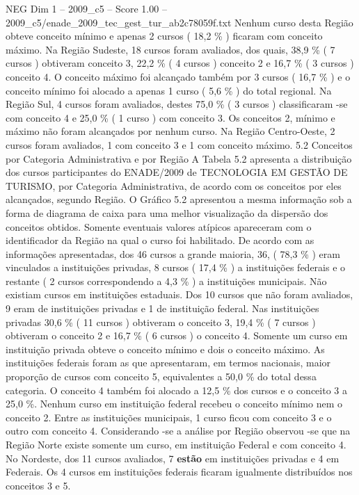 \begin{textsample}{NEG Dim 1 – 2009\_c5 – Score 1.00 – 2009\_c5/enade\_2009\_tec\_gest\_tur\_ab2c78059f.txt}
Nenhum curso desta Região obteve conceito mínimo e apenas 2 cursos ( 18,2 \% ) ficaram com conceito máximo.
Na Região Sudeste, 18 cursos foram avaliados, dos quais, 38,9 \% ( 7 cursos ) obtiveram conceito 3, 22,2 \% ( 4 cursos ) conceito 2 e 16,7 \% ( 3 cursos ) conceito 4.
O conceito máximo foi alcançado também por 3 cursos ( 16,7 \% ) e o conceito mínimo foi alocado a apenas 1 curso ( 5,6 \% ) do total regional.
Na Região Sul, 4 cursos foram avaliados, destes 75,0 \% ( 3 cursos ) classificaram -se com conceito 4 e 25,0 \% ( 1 curso ) com conceito 3.
Os conceitos 2, mínimo e máximo não foram alcançados por nenhum curso.
Na Região Centro-Oeste, 2 cursos foram avaliados, 1 com conceito 3 e 1 com conceito máximo. 5.2 Conceitos por Categoria Administrativa e por Região A Tabela 5.2 apresenta a distribuição dos cursos participantes do ENADE/2009 de TECNOLOGIA EM GESTÃO DE TURISMO, por Categoria Administrativa, de acordo com os conceitos por eles alcançados, segundo Região.
O Gráfico 5.2 apresentou a mesma informação sob a forma de diagrama de caixa para uma melhor visualização da dispersão dos conceitos obtidos.
Somente eventuais valores atípicos apareceram com o identificador da Região na qual o curso foi habilitado.
De acordo com as informações apresentadas, dos 46 cursos a grande maioria, 36, ( 78,3 \% ) eram vinculados a instituições privadas, 8 cursos ( 17,4 \% ) a instituições federais e o restante ( 2 cursos correspondendo a 4,3 \% ) a instituições municipais.
Não existiam cursos em instituições estaduais.
Dos 10 cursos que não foram avaliados, 9 eram de instituições privadas e 1 de instituição federal.
Nas instituições privadas 30,6 \% ( 11 cursos ) obtiveram o conceito 3, 19,4 \% ( 7 cursos ) obtiveram o conceito 2 e 16,7 \% ( 6 cursos ) o conceito 4.
Somente um curso em instituição privada obteve o conceito mínimo e dois o conceito máximo.
As instituições federais foram as que apresentaram, em termos nacionais, maior proporção de cursos com conceito 5, equivalentes a 50,0 \% do total dessa categoria.
O conceito 4 também foi alocado a 12,5 \% dos cursos e o conceito 3 a 25,0 \%.
Nenhum curso em instituição federal recebeu o conceito mínimo nem o conceito 2.
Entre as instituições municipais, 1 curso ficou com conceito 3 e o outro com conceito 4.
Considerando -se a análise por Região observou -se que na Região Norte existe somente um curso, em instituição Federal e com conceito 4.
No Nordeste, dos 11 cursos avaliados, 7 \textbf{estão} em instituições privadas e 4 em Federais.
Os 4 cursos em instituições federais ficaram igualmente distribuídos nos conceitos 3 e 5.

\end{textsample}
